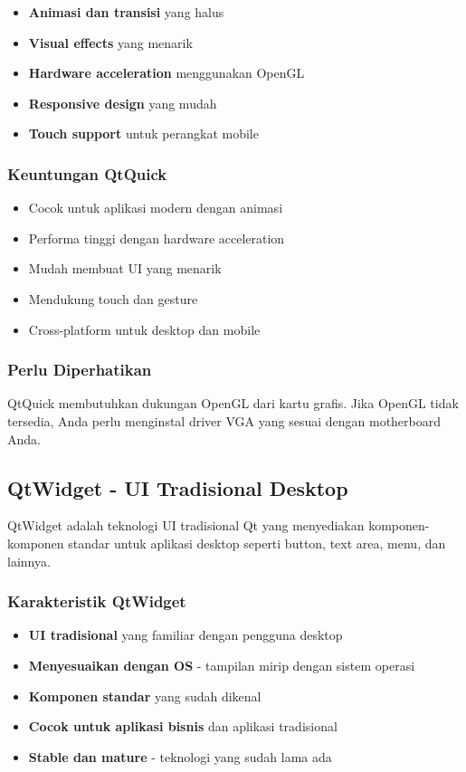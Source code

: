 \begin{itemize}
\item \textbf{Animasi dan transisi} yang halus
\item \textbf{Visual effects} yang menarik
\item \textbf{Hardware acceleration} menggunakan OpenGL
\item \textbf{Responsive design} yang mudah
\item \textbf{Touch support} untuk perangkat mobile
\end{itemize}

\subsubsection{Keuntungan QtQuick}

\begin{itemize}
\item Cocok untuk aplikasi modern dengan animasi
\item Performa tinggi dengan hardware acceleration
\item Mudah membuat UI yang menarik
\item Mendukung touch dan gesture
\item Cross-platform untuk desktop dan mobile
\end{itemize}

\subsubsection{Perlu Diperhatikan}

QtQuick membutuhkan dukungan OpenGL dari kartu grafis. Jika OpenGL tidak tersedia, Anda perlu menginstal driver VGA yang sesuai dengan motherboard Anda.

\subsection{QtWidget - UI Tradisional Desktop}

QtWidget adalah teknologi UI tradisional Qt yang menyediakan komponen-komponen standar untuk aplikasi desktop seperti button, text area, menu, dan lainnya.

\subsubsection{Karakteristik QtWidget}

\begin{itemize}
\item \textbf{UI tradisional} yang familiar dengan pengguna desktop
\item \textbf{Menyesuaikan dengan OS} - tampilan mirip dengan sistem operasi
\item \textbf{Komponen standar} yang sudah dikenal
\item \textbf{Cocok untuk aplikasi bisnis} dan aplikasi tradisional
\item \textbf{Stable dan mature} - teknologi yang sudah lama ada
\end{itemize}

